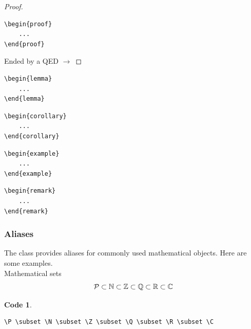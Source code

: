 \documentclass{course}
\theoremstyle{unnumbered}
\newtheorem{code}{Code}
\begin{document}
\begin{proof}
	\begin{lstlisting}
\begin{proof}
	...
\end{proof}
\end{lstlisting}
	Ended by a QED $\rightarrow$
\end{proof}

\begin{lemma}
	\begin{lstlisting}
\begin{lemma}
	...
\end{lemma}
\end{lstlisting}
\end{lemma}

\begin{corollary}
	\begin{lstlisting}
\begin{corollary}
	...
\end{corollary}
\end{lstlisting}
\end{corollary}

\begin{example}
	\begin{lstlisting}
\begin{example}
	...
\end{example}
\end{lstlisting}
\end{example}

\begin{remark}
	\begin{lstlisting}
\begin{remark}
	...
\end{remark}
\end{lstlisting}
\end{remark}


\subsubsection{Aliases}
The class provides aliases for commonly used mathematical objects. Here are some examples.\\
Mathematical sets
\[
	\mathcal{P} \subset \mathbb{N} \subset \mathbb{Z} \subset \mathbb{Q} \subset \mathbb{R} \subset \mathbb{C}
\]
\begin{code}
	\begin{lstlisting}
\P \subset \N \subset \Z \subset \Q \subset \R \subset \C
\end{lstlisting}
\end{code}
\end{document}
